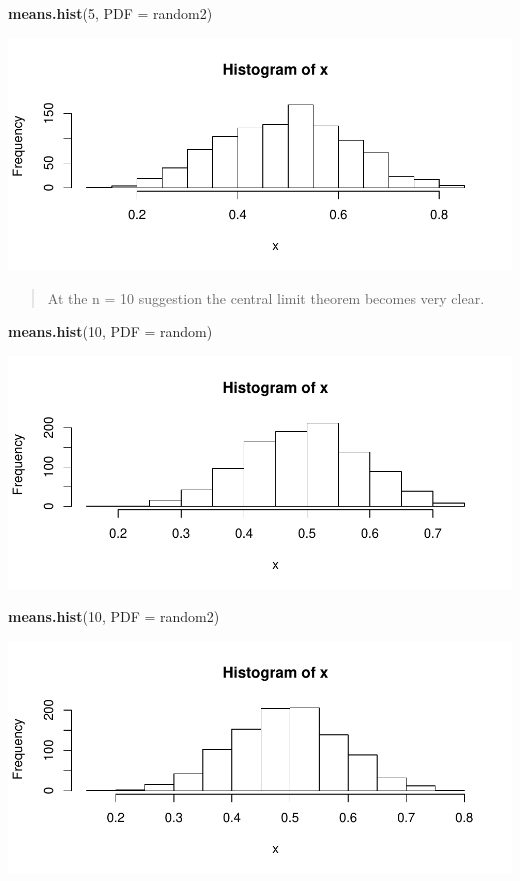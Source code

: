 \documentclass[]{article}
\newenvironment{Shaded}{\begin{snugshade}}{\end{snugshade}}
\newcommand{\KeywordTok}[1]{\textcolor[rgb]{0.13,0.29,0.53}{\textbf{{#1}}}}
\newcommand{\DataTypeTok}[1]{\textcolor[rgb]{0.13,0.29,0.53}{{#1}}}
\newcommand{\DecValTok}[1]{\textcolor[rgb]{0.00,0.00,0.81}{{#1}}}
\newcommand{\NormalTok}[1]{{#1}}
\begin{document}
\begin{Shaded}
\begin{Highlighting}[]
\KeywordTok{means.hist}\NormalTok{(}\DecValTok{5}\NormalTok{, }\DataTypeTok{PDF =} \NormalTok{random2)}
\end{Highlighting}
\end{Shaded}

\includegraphics{CHunt_Assign9_PS1_files/figure-latex/unnamed-chunk-8-2.pdf}

\begin{quote}
At the n = 10 suggestion the central limit theorem becomes very clear.
\end{quote}

\begin{Shaded}
\begin{Highlighting}[]
\KeywordTok{means.hist}\NormalTok{(}\DecValTok{10}\NormalTok{, }\DataTypeTok{PDF =} \NormalTok{random)}
\end{Highlighting}
\end{Shaded}

\includegraphics{CHunt_Assign9_PS1_files/figure-latex/unnamed-chunk-9-1.pdf}

\begin{Shaded}
\begin{Highlighting}[]
\KeywordTok{means.hist}\NormalTok{(}\DecValTok{10}\NormalTok{, }\DataTypeTok{PDF =} \NormalTok{random2)}
\end{Highlighting}
\end{Shaded}

\includegraphics{CHunt_Assign9_PS1_files/figure-latex/unnamed-chunk-9-2.pdf}
\end{document}
